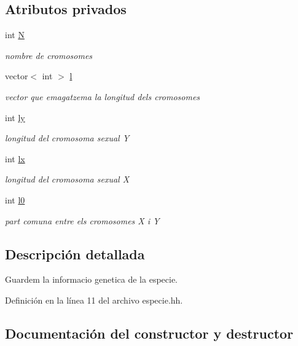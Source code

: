 \subsection*{Atributos privados}
\begin{DoxyCompactItemize}
\item 
int \hyperlink{classespecie_a3333db40d4af2c0073d50afea08e0296}{N}
\begin{DoxyCompactList}\small\item\em nombre de cromosomes \end{DoxyCompactList}\item 
vector$<$ int $>$ \hyperlink{classespecie_a754d7eefb82d1ebe3f573cff16dd43ee}{l}
\begin{DoxyCompactList}\small\item\em vector que emagatzema la longitud dels cromosomes \end{DoxyCompactList}\item 
int \hyperlink{classespecie_ad6993a4730779e367c432cce91780895}{ly}
\begin{DoxyCompactList}\small\item\em longitud del cromosoma sexual Y \end{DoxyCompactList}\item 
int \hyperlink{classespecie_af620813fbc24dd91e5a25d38b5847bf8}{lx}
\begin{DoxyCompactList}\small\item\em longitud del cromosoma sexual X \end{DoxyCompactList}\item 
int \hyperlink{classespecie_a7e4448f0f61a573753aa7000ad073982}{l0}
\begin{DoxyCompactList}\small\item\em part comuna entre els cromosomes X i Y \end{DoxyCompactList}\end{DoxyCompactItemize}


\subsection{Descripción detallada}
Guardem la informacio genetica de la especie. 

Definición en la línea 11 del archivo especie.\+hh.



\subsection{Documentación del constructor y destructor}
